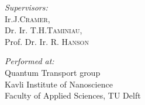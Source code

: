 \documentclass[a4paper,10pt]{report}
\begin{document}
\begin{minipage}{0.5\textwidth}
\begin{flushleft} \large
\emph{Supervisors:}\\
Ir.J.\textsc{Cramer}, \\
Dr. Ir. T.H.\textsc{Taminiau}, \\
Prof. Dr. Ir. R. \textsc{Hanson}
\end{flushleft}
\end{minipage}
\begin{minipage}{0.5\textwidth}
\begin{flushright} \large
\emph{Performed at:} \\
Quantum Transport group \\
Kavli Institute of Nanoscience \\
Faculty of Applied Sciences, TU Delft
\end{flushright}
\end{minipage}





\normalsize

\newpage
\end{document}
